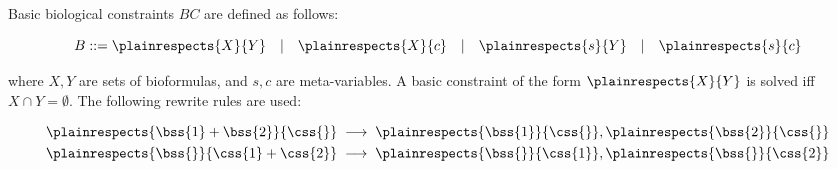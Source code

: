 Basic biological constraints $BC$ are defined as follows:

\[
  B ::= \plainrespects{X}{Y} \quad | \quad \plainrespects{X}{c}
  \quad | \quad \plainrespects{s}{Y} \quad | \quad \plainrespects{s}{c}
\]

where $X, Y$ are sets of bioformulas, and $s, c$ are meta-variables.
A basic constraint of the form $\plainrespects{X}{Y}$ is solved iff
$X \cap Y = \emptyset$.
The following rewrite rules are used:

\begin{align*}
  \plainrespects{\bss{1} + \bss{2}}{\css{}}
  \; & \longrightarrow \; \plainrespects{\bss{1}}{\css{}},
    \plainrespects{\bss{2}}{\css{}} \\
  \plainrespects{\bss{}}{\css{1} + \css{2}}
  \; & \longrightarrow \; \plainrespects{\bss{}}{\css{1}},
       \plainrespects{\bss{}}{\css{2}}
\end{align*}



